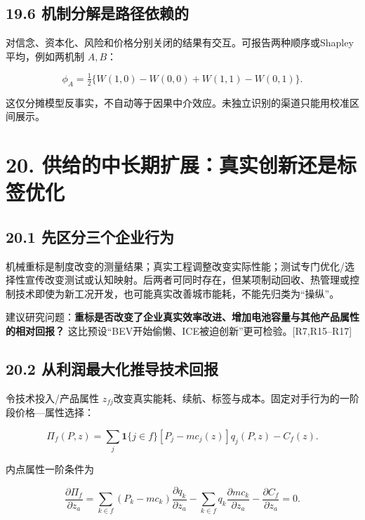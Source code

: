 \documentclass[
  11pt,
]{article}
\begin{document}
\subsection{19.6
机制分解是路径依赖的}\label{ux673aux5236ux5206ux89e3ux662fux8defux5f84ux4f9dux8d56ux7684}

对信念、资本化、风险和价格分别关闭的结果有交互。可报告两种顺序或Shapley平均，例如两机制
\(A,B\)：

\[
\phi_A=\tfrac12\{W(1,0)-W(0,0)+W(1,1)-W(0,1)\}.
\tag{87}
\]

这仅分摊模型反事实，不自动等于因果中介效应。未独立识别的渠道只能用校准区间展示。

\section{20.
供给的中长期扩展：真实创新还是标签优化}\label{ux4f9bux7ed9ux7684ux4e2dux957fux671fux6269ux5c55ux771fux5b9eux521bux65b0ux8fd8ux662fux6807ux7b7eux4f18ux5316}

\subsection{20.1
先区分三个企业行为}\label{ux5148ux533aux5206ux4e09ux4e2aux4f01ux4e1aux884cux4e3a}

机械重标是制度改变的测量结果；真实工程调整改变实际性能；测试专门优化/选择性宣传改变测试或认知映射。后两者可同时存在，但某项制动回收、热管理或控制技术即使为新工况开发，也可能真实改善城市能耗，不能先归类为``操纵''。

建议研究问题：\textbf{重标是否改变了企业真实效率改进、增加电池容量与其他产品属性的相对回报？}
这比预设``BEV开始偷懒、ICE被迫创新''更可检验。{[}R7,R15--R17{]}

\subsection{20.2
从利润最大化推导技术回报}\label{ux4eceux5229ux6da6ux6700ux5927ux5316ux63a8ux5bfcux6280ux672fux56deux62a5}

令技术投入/产品属性
\(z_{fj}\)改变真实能耗、续航、标签与成本。固定对手行为的一阶段价格---属性选择：

\[
\Pi_f(P,z)=\sum_j\mathbf1\{j\in f\}
[P_j-mc_j(z)]q_j(P,z)-C_f(z).
\tag{88}
\]

内点属性一阶条件为

\[
\boxed{
\frac{\partial\Pi_f}{\partial z_a}
=\sum_{k\in f}(P_k-mc_k)\frac{\partial q_k}{\partial z_a}
-\sum_{k\in f}q_k\frac{\partial mc_k}{\partial z_a}
-\frac{\partial C_f}{\partial z_a}=0.
}
\tag{89}
\]
\end{document}
